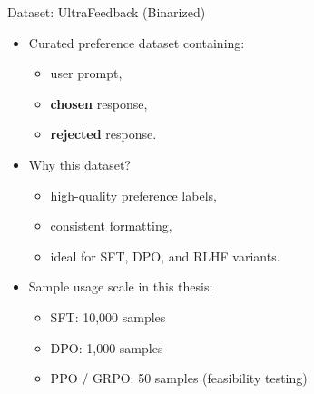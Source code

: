 \documentclass[10pt]{beamer}
\begin{document}
\begin{frame}{Dataset: UltraFeedback (Binarized)}
\large
\begin{itemize}
    \item<1-> Curated preference dataset containing:
    \begin{itemize}
        \item user prompt,
        \item \textbf{chosen} response,
        \item \textbf{rejected} response.
    \end{itemize}

    \vspace{0.35cm}

    \item<2-> Why this dataset?
    \begin{itemize}
        \item high-quality preference labels,
        \item consistent formatting,
        \item ideal for SFT, DPO, and RLHF variants.
    \end{itemize}

    \vspace{0.35cm}

    \item<3-> Sample usage scale in this thesis:
    \begin{itemize}
        \item SFT: 10{,}000 samples  
        \item DPO: 1{,}000 samples  
        \item PPO / GRPO: 50 samples (feasibility testing)
    \end{itemize}
\end{itemize}

\end{frame}
\end{document}
